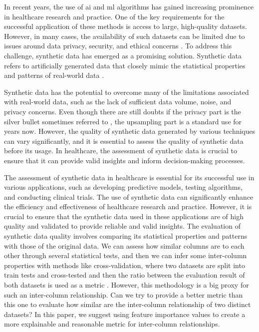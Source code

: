 In recent years, the use of \ac{ai} and \ac{ml} algorithms has gained increasing prominence in healthcare research and practice. One of the key requirements for the successful application of these methods is access to large, high-quality datasets. However, in many cases, the availability of such datasets can be limited due to issues around data privacy, security, and ethical concerns \cite{chingOpportunitiesObstaclesDeep2018a}. To address this challenge, synthetic data has emerged as a promising solution. Synthetic data refers to artificially generated data that closely mimic the statistical properties and patterns of real-world data \cite{mullerEvaluationSyntheticElectronic2022}.

Synthetic data has the potential to overcome many of the limitations associated with real-world data, such as the lack of sufficient data volume, noise, and privacy concerns. Even though there are still doubts if the privacy part is the silver bullet sometimes referred to \cite{stadlerSyntheticDataPrivacy2020}, the upsampling part is a standard use for years now. However, the quality of synthetic data generated by various techniques can vary significantly, and it is essential to assess the quality of synthetic data before its usage. In healthcare, the assessment of synthetic data is crucial to ensure that it can provide valid insights and inform decision-making processes.

The assessment of synthetic data in healthcare is essential for its successful use in various applications, such as developing predictive models, testing algorithms, and conducting clinical trials. The use of synthetic data can significantly enhance the efficiency and effectiveness of healthcare research and practice. However, it is crucial to ensure that the synthetic data used in these applications are of high quality and validated to provide reliable and valid insights. The evaluation of synthetic data quality involves comparing its statistical properties and patterns with those of the original data. We can assess how similar columns are to each other through several statistical tests, and then we can infer some inter-column properties with methods like cross-validation, where two datasets are split into train tests and cross-tested and then the ratio between the evaluation result of both datasets is used as a metric \cite{mullerEvaluationSyntheticElectronic2022,goncalvesGenerationEvaluationSynthetic2020a}. However, this methodology is a big proxy for such an inter-column relationship. Can we try to provide a better metric than this one to evaluate how similar are the inter-column relationship of two distinct datasets? In this paper, we suggest using feature importance values to create a more explainable and reasonable metric for inter-column relationships.
